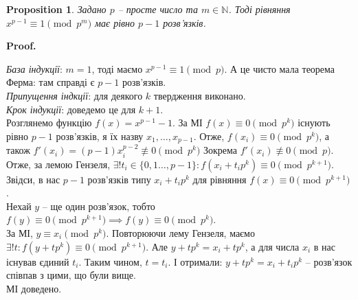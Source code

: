 \documentclass[a4paper, 10pt]{article}
\makeatletter
\theoremstyle{theoremdd}
\theoremstyle{theoremdd}
\theoremstyle{theoremdd}
\theoremstyle{theoremdd}
\theoremstyle{theoremdd}
\newtheorem{proposition}[theorem]{Proposition}
\theoremstyle{theoremdd}
\theoremstyle{theoremdd}
\theoremstyle{theoremdd}
\renewenvironment{proof}[1][Proof.\\]{\par
\pushQED{\hfill \qed}%
\normalfont \topsep6\p@\@plus6\p@\relax
\trivlist
\item\relax
{\bfseries
#1\@addpunct{.}}\hspace\labelsep\ignorespaces
}{%
\popQED\endtrivlist\@endpefalse
}
\makeatother
\begin{document}
\begin{proposition}
Задано $p$ -- просте число та $m \in \mathbb{N}$. Тоді рівняння $x^{p-1} \equiv 1 \pmod {p^m}$ має рівно $p-1$ розв'язків.
\end{proposition}

\begin{proof}
\textit{База індукції}: $m = 1$, тоді маємо $x^{p-1} \equiv 1 \pmod p$. А це чисто мала теорема Ферма: там справді є $p-1$ розв'язків.\\
\textit{Припущення індкції}: для деякого $k$ твердження виконано.\\
\textit{Крок індукції}: доведемо це для $k+1$.\\
Розглянемо функцію $f(x) = x^{p-1} - 1$. За МІ $f(x) \equiv 0 \pmod {p^k}$ існують рівно $p-1$ розв'язків, я їх назву $x_1,\dots,x_{p-1}$. Отже, $f(x_i) \equiv 0 \pmod {p^k}$, а також $f'(x_i) = (p-1)x_i^{p-2} \not\equiv 0 \pmod {p^k}$ Зокрема $f'(x_i) \not\equiv 0 \pmod p$.\\
Отже, за лемою Гензеля, $\exists! t_i \in \{0,1\dots,p-1\}: f(x_i+t_i p^k) \equiv 0 \pmod {p^{k+1}}$.\\
Звідси, в нас $p-1$ розв'язків типу $x_i+t_ip^k$ для рівняння $f(x) \equiv 0 \pmod {p^{k+1}}$.\\
Нехай $y$ -- ще один розв'язок, тобто \\
$f(y) \equiv 0 \pmod {p^{k+1}} \implies f(y) \equiv 0 \pmod {p^k}$. \\
За МІ, $y \equiv x_i \pmod {p^k}$. Повторюючи лему Гензеля, маємо $\exists !t: f(y+tp^k) \equiv 0 \pmod {p^{k+1}}$. Але $y+tp^k = x_i+tp^k$, а для числа $x_i$ в нас існував єдиний $t_i$. Таким чином, $t = t_i$. І отримали: $y + tp^k = x_i + t_ip^k$ -- розв'язок співпав з цими, що були вище.\\
МІ доведено.
\end{proof}
\end{document}
